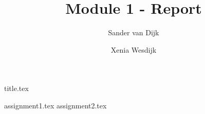 \documentclass[final]{scrreprt} %
\title{Module 1 - Report}
\author{Sander {van Dijk} \and Xenia {Wesdijk}}
\begin{document}

{title.tex}

\newpage

\tableofcontents

\newpage
{}
{assignment1.tex}
{assignment2.tex}
\newpage
{}

\printbibliography
\end{document}

